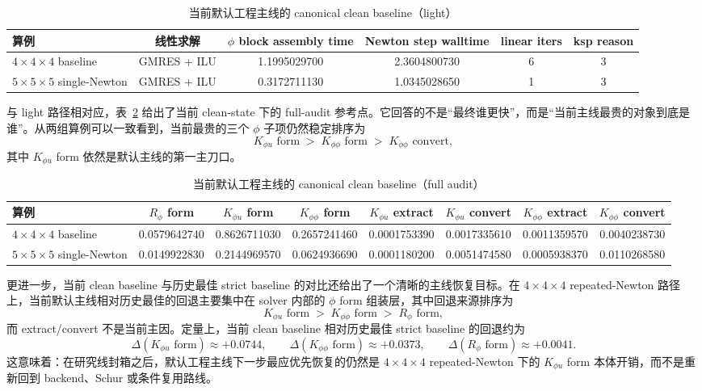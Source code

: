 \documentclass[12pt,a4paper]{ctexart}
\numberwithin{equation}{section}
\begin{document}
\begin{table}[H]
\centering
\caption{当前默认工程主线的 canonical clean baseline（light）}
\label{tab:current-clean-baseline-light}
\small
\begin{tabular}{lccccc}
\toprule
算例 & 线性求解 & $\phi$ block assembly time & Newton step walltime & linear iters & ksp reason \\
\midrule
$4\times4\times4$ baseline & GMRES + ILU & 1.1995029700 & 2.3604800730 & 6 & 3 \\
$5\times5\times5$ single-Newton & GMRES + ILU & 0.3172711130 & 1.0345028650 & 1 & 3 \\
\bottomrule
\end{tabular}
\end{table}

与 light 路径相对应，表~\ref{tab:current-clean-baseline-full} 给出了当前 clean-state 下的 full-audit 参考点。它回答的不是“最终谁更快”，而是“当前主线最贵的对象到底是谁”。从两组算例可以一致看到，当前最贵的三个 $\phi$ 子项仍然稳定排序为
\[
K_{\phi u}\text{ form} \;>\; K_{\phi\phi}\text{ form} \;>\; K_{\phi\phi}\text{ convert},
\]
其中 $K_{\phi u}$ form 依然是默认主线的第一主刀口。

\begin{table}[H]
\centering
\caption{当前默认工程主线的 canonical clean baseline（full audit）}
\label{tab:current-clean-baseline-full}
\small
\begin{tabular}{lccccccc}
\toprule
算例 & $R_\phi$ form & $K_{\phi u}$ form & $K_{\phi\phi}$ form & $K_{\phi u}$ extract & $K_{\phi u}$ convert & $K_{\phi\phi}$ extract & $K_{\phi\phi}$ convert \\
\midrule
$4\times4\times4$ baseline & 0.0579642740 & 0.8626711030 & 0.2657241460 & 0.0001753390 & 0.0017335610 & 0.0011359570 & 0.0040238730 \\
$5\times5\times5$ single-Newton & 0.0149922830 & 0.2144969570 & 0.0624936690 & 0.0001180200 & 0.0051474580 & 0.0005938370 & 0.0110268580 \\
\bottomrule
\end{tabular}
\end{table}

更进一步，当前 clean baseline 与历史最佳 strict baseline 的对比还给出了一个清晰的主线恢复目标。在 $4\times4\times4$ repeated-Newton 路径上，当前默认主线相对历史最佳的回退主要集中在 solver 内部的 $\phi$ form 组装层，其中回退来源排序为
\[
K_{\phi u}\text{ form} \;>\; K_{\phi\phi}\text{ form} \;>\; R_\phi\text{ form},
\]
而 extract/convert 不是当前主因。定量上，当前 clean baseline 相对历史最佳 strict baseline 的回退约为
\[
\Delta(K_{\phi u}\text{ form}) \approx +0.0744,\qquad
\Delta(K_{\phi\phi}\text{ form}) \approx +0.0373,\qquad
\Delta(R_\phi\text{ form}) \approx +0.0041.
\]
这意味着：在研究线封箱之后，默认工程主线下一步最应优先恢复的仍然是 $4\times4\times4$ repeated-Newton 下的 $K_{\phi u}$ form 本体开销，而不是重新回到 backend、Schur 或条件复用路线。
\end{document}
